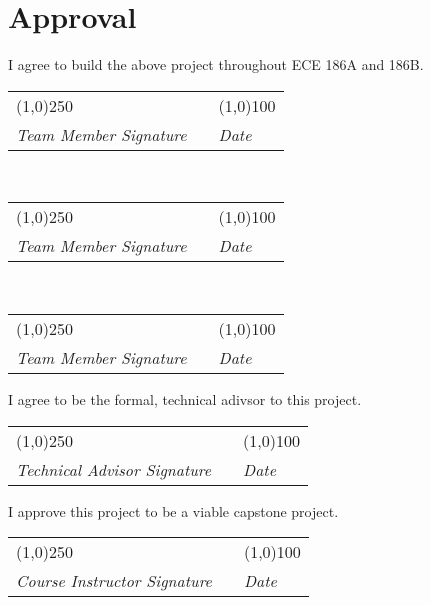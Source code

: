  
		 
		 
		 
		 
		 
		 
	 \newpage
	 \section{Approval}
		\begin{flushleft}
			I agree to build the above project throughout ECE 186A and 186B.\\
			\vspace{2em}
			\begin{tabular}{l l l}
				\line(1,0){250} & \hfill & \line(1,0){100}\\
				\textit{Team Member Signature} & & \textit{Date}				
			\end{tabular}
			\vspace{2em}\\
			\begin{tabular}{l l l}
				\line(1,0){250} & \hfill & \line(1,0){100}\\
				\textit{Team Member Signature} & & \textit{Date}
			\end{tabular}
			\vspace{2em}\\
			\begin{tabular}{l l l}
				\line(1,0){250} & \hfill & \line(1,0){100}\\
				\textit{Team Member Signature} & & \textit{Date}
			\end{tabular}
			\vspace{5em}
			
			I agree to be the formal, technical adivsor to this project.\\
			\vspace{2em}
			\begin{tabular}{l l l}
				\line(1,0){250} & \hfill & \line(1,0){100}\\
				\textit{Technical Advisor Signature} & & \textit{Date}
			\end{tabular}
			\vspace{5em}
			
			I approve this project to be a viable capstone project.\\
			\vspace{2em}
			\begin{tabular}{l l l}
				\line(1,0){250} & \hfill & \line(1,0){100}\\
				\textit{Course Instructor Signature} & & \textit{Date}
			\end{tabular}
		\end{flushleft}		 
		 
